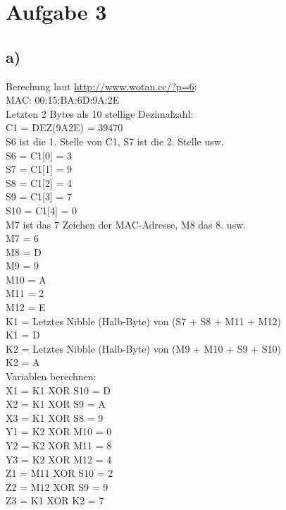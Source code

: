 \documentclass[10pt,a4paper]{article}
\begin{document}
\section{Aufgabe 3}

\subsection*{a)}
Berechung laut \href{http://www.wotan.cc/?p=6}{http://www.wotan.cc/?p=6}:\\
MAC: 00:15:BA:6D:9A:2E\\
Letzten 2 Bytes als 10 stellige Dezimalzahl:\\
C1 = DEZ(9A2E) = 39470\\
 
S6 ist die 1. Stelle von C1, S7 ist die 2. Stelle usw.\\
S6 = C1[0] = 3 \\
S7 = C1[1] = 9 \\
S8 = C1[2] = 4 \\
S9 = C1[3] = 7 \\
S10 = C1[4] = 0 \\
 
M7 ist das 7 Zeichen der MAC-Adresse, M8 das 8. usw.\\
M7 =  6 \\
M8 =  D \\
M9 =  9 \\
M10 =  A \\
M11 =  2 \\
M12 =  E \\

K1 = Letztes Nibble (Halb-Byte) von (S7 + S8 + M11 + M12)\\
K1 =  D \\

K2 = Letztes Nibble (Halb-Byte) von (M9 + M10 + S9 + S10)\\
K2 =  A \\

Variablen berechnen:\\
X1 = K1  XOR S10 =  D \\
X2 = K1  XOR S9  =  A \\
X3 = K1  XOR S8  =  9 \\
Y1 = K2  XOR M10 =  0 \\
Y2 = K2  XOR M11 =  8 \\
Y3 = K2  XOR M12 =  4 \\
Z1 = M11 XOR S10 =  2 \\
Z2 = M12 XOR S9  =  9 \\
Z3 = K1  XOR K2  =  7 \\
 
\end{document}
